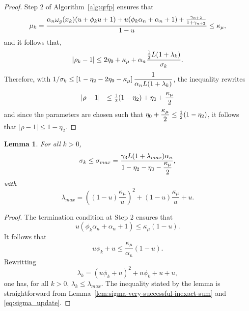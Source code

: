 \documentclass{article}[12pt]
\newtheorem{lemma}[]{Lemma}
\begin{document}
\begin{proof}
    	Step 2 of Algorithm~\ref{alg:qrfp} ensures that
    	\begin{equation*}
    		\mu_k = \dfrac{\alpha_n \omega_g(x_k)(u+\phi_k u+1) + u(\phi_k\alpha_n+\alpha_n+1) + \frac{\gamma_{n+2}}{1+\gamma_{n+2}}}{1-u} \leq \kappa_\mu,
    	\end{equation*}
    	and it follows that,
    	\begin{equation}
    		|\rho_k-1| \leq 2\eta_0+ \kappa_\mu + \alpha_n\dfrac{\frac{1}{2}L(1+\lambda_k)}{\sigma_k}.
    	\end{equation}
    	Therefore, with $1/\sigma_k \leq \left[1-\eta_2 - 2\eta_0 - \kappa_\mu\right]\dfrac{1}{\alpha_nL(1+\lambda_k)}$, the inequality rewrites
    	\begin{equation}
    		\begin{array}{ll}
    			|\rho-1| & \leq \frac{1}{2}(1-\eta_2) + \eta_0 + \dfrac{\kappa_\mu}{2}
    		\end{array} 
    	\end{equation}
    	and since the parameters are chosen such that $\eta_0+\dfrac{\kappa_\mu}{2} \leq \frac{1}{2}(1-\eta_2)$, it follows that $|\rho-1| \leq 1-\eta_2$.
    \end{proof}

	\begin{lemma}
		\label{lem:sigma_max}
		For all $k>0$,
		\begin{equation}
			\sigma_k \leq \sigma_{max} =  \dfrac{\gamma_3 L(1+\lambda_{max})\alpha_n}{ 1-\eta_2 - \eta_0 - \dfrac{\kappa_\mu}{2}},
		\end{equation}
		with \begin{equation*}
			\lambda_{max} = \left((1-u)\dfrac{\kappa_\mu}{u}\right)^2 + (1-u)\dfrac{\kappa_\mu}{u} +u.
		\end{equation*}
	\end{lemma}
	\begin{proof}
		The termination condition at Step 2 ensures that
		\begin{equation}
			u(\phi_k\alpha_n+\alpha_n+1) \leq \kappa_\mu(1-u). 
		\end{equation}
		It follows that 
		\begin{equation}
			u\phi_k +u \leq \dfrac{\kappa_\mu}{\alpha_n}(1-u).
		\end{equation}
		Rewritting 
		\begin{equation}
			\lambda_k = (u\phi_k +u)^2 + u\phi_k +u + u,
		\end{equation}
		one has, for all $k>0$, $\lambda_k \leq \lambda_{max}$.
		The inequality stated by the lemma is straightforward from Lemma~\ref{lem:sigma-very-successful-inexact-sum} and \eqref{eq:sigma_update}.
	\end{proof}
\end{document}
